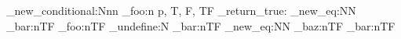 \prg_new_conditional:Nnn
  \module_foo:n
  { p, T, F, TF }
  { \prg_return_true: }
\cs_new_eq:NN
  \module_bar:nTF
  \module_foo:nTF
\cs_undefine:N
  \module_bar:nTF
\cs_new_eq:NN  %
  \module_baz:nTF
  \module_bar:nTF
